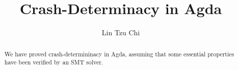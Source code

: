 \documentclass[letterpaper,twocolumn,10pt]{article}
\theoremstyle{definition}
\begin{document}
\title{Crash-Determinacy in Agda}
\author{Lin Tzu Chi}
\maketitle

\begin{abstract}
We have proved crash-determininacy in Agda, assuming that some essential properties have been verified by an SMT solver.
\end{abstract}












\end{document}
